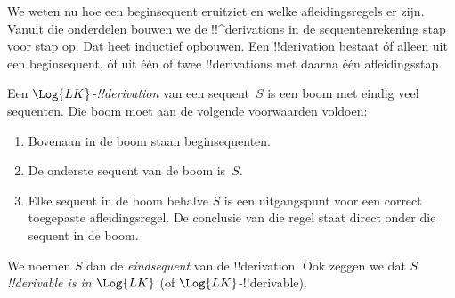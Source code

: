 \documentclass[openany]{memoir}
\begin{document}
\begingroup
\def\olfilename{OLP-0074}
\def\olfilepath{content/first-order-logic/sequent-calculus/}
\hypertarget{unit-OLP-0074}{}



      {}
      {}


\begin{explain}
We weten nu hoe een beginsequent eruitziet en welke afleidingsregels er
zijn. Vanuit die onderdelen bouwen we de !!^{derivation}s in de
sequentenrekening stap voor stap op. Dat heet inductief opbouwen. Een
!!{derivation} bestaat óf alleen uit een beginsequent, óf uit één of
twee !!{derivation}s met daarna één afleidingsstap.
\end{explain}

\begin{defn}
Een \emph{$\Log{LK}$-!!{derivation}} van een sequent~$S$ is een boom
met eindig veel sequenten. Die boom moet aan de volgende voorwaarden
voldoen:
\begin{enumerate}
\item Bovenaan in de boom staan beginsequenten.
\item De onderste sequent van de boom is~$S$.
\item Elke sequent in de boom behalve $S$ is een uitgangspunt voor een
  correct toegepaste afleidingsregel. De conclusie van die regel staat
  direct onder die sequent in de boom.
\end{enumerate}
We noemen $S$ dan de \emph{eindsequent} van de !!{derivation}. Ook
zeggen we dat $S$ \emph{!!{derivable} is in $\Log{LK}$} (of
$\Log{LK}$-!!{derivable}).
\end{defn}
\end{document}
